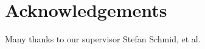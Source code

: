 \section{Acknowledgements}\label{sec:acknowledgements}
Many thanks to our supervisor Stefan Schmid, et al.
